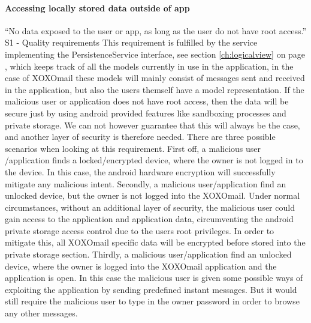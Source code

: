 \paragraph{Accessing locally stored data outside of app}\hfill
\newline
“No data exposed to the user or app, as long as the user do not have root access.” S1 - Quality requirements
\newline
\newline
This requirement is fulfilled by the service implementing the PersistenceService interface, see section \ref{ch:logicalview} on page \pageref{ch:logicalview}, which keeps track of all the models currently in use in the application, in the case of XOXOmail these models will mainly consist of messages sent and received in the application, but also the users themself have a model representation. If the malicious user or application does not have root access, then the data will be secure just by using android provided features like sandboxing processes and private storage. We can not however guarantee that this will always be the case, and another layer of security is therefore needed. 
\newline
\newline
There are three possible scenarios when looking at this requirement. First off, a malicious user /application finds a locked/encrypted device, where the owner is not logged in to the device. In this case, the android hardware encryption will successfully mitigate any malicious intent.
Secondly, a malicious user/application find an unlocked device, but the owner is not logged into the XOXOmail. Under normal circumstances, without an additional layer of security, the malicious user could gain access to the application and application data, circumventing the android private storage access control due to the users root privileges. In order to mitigate this, all XOXOmail specific data will be encrypted before stored into the private storage section. 
Thirdly, a malicious user/application find an unlocked device, where the owner is logged into the XOXOmail application and the application is open. In this case the malicious user is given some possible ways of exploiting the application by sending predefined instant messages. But it would still require the malicious user to type in the owner password in order to browse any other messages. 

